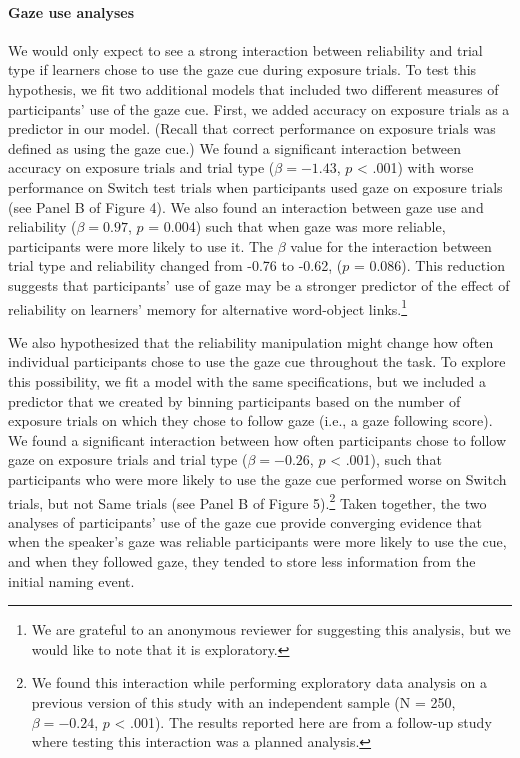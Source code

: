 \documentclass[authoryear, review]{elsarticle}
\begin{document}
\paragraph{Gaze use analyses}\label{gaze-use-analyses}

We would only expect to see a strong interaction between reliability and
trial type if learners chose to use the gaze cue during exposure trials.
To test this hypothesis, we fit two additional models that included two
different measures of participants' use of the gaze cue. First, we added
accuracy on exposure trials as a predictor in our model. (Recall that
correct performance on exposure trials was defined as using the gaze
cue.) We found a significant interaction between accuracy on exposure
trials and trial type (\(\beta = -1.43\), \(p\) \textless{} .001) with
worse performance on Switch test trials when participants used gaze on
exposure trials (see Panel B of Figure 4). We also found an interaction
between gaze use and reliability (\(\beta = 0.97\), \(p\) = 0.004) such
that when gaze was more reliable, participants were more likely to use
it. The \(\beta\) value for the interaction between trial type and
reliability changed from -0.76 to -0.62, (\(p\) = 0.086). This reduction
suggests that participants' use of gaze may be a stronger predictor of
the effect of reliability on learners' memory for alternative
word-object links.\footnote{We are grateful to an anonymous reviewer for
  suggesting this analysis, but we would like to note that it is
  exploratory.}

We also hypothesized that the reliability manipulation might change how
often individual participants chose to use the gaze cue throughout the
task. To explore this possibility, we fit a model with the same
specifications, but we included a predictor that we created by binning
participants based on the number of exposure trials on which they chose
to follow gaze (i.e., a gaze following score). We found a significant
interaction between how often participants chose to follow gaze on
exposure trials and trial type (\(\beta = -0.26\), \(p\) \textless{}
.001), such that participants who were more likely to use the gaze cue
performed worse on Switch trials, but not Same trials (see Panel B of
Figure 5).\footnote{We found this interaction while performing
  exploratory data analysis on a previous version of this study with an
  independent sample (N = 250, \(\beta = -0.24\), \(p\) \textless{}
  .001). The results reported here are from a follow-up study where
  testing this interaction was a planned analysis.} Taken together, the
two analyses of participants' use of the gaze cue provide converging
evidence that when the speaker's gaze was reliable participants were
more likely to use the cue, and when they followed gaze, they tended to
store less information from the initial naming event.
\end{document}
